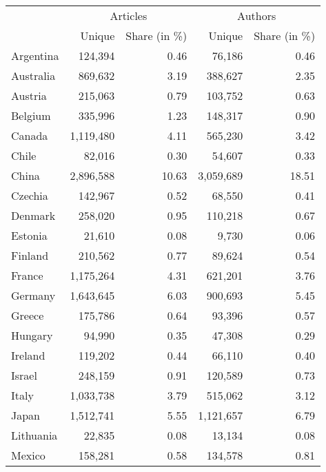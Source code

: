 \begin{tabular}{lrrrr}
\toprule
{} & \multicolumn{2}{c}{Articles} & \multicolumn{2}{c}{Authors} \\
{} &    Unique & Share (in \%) &    Unique & Share (in \%) \\
\midrule
Argentina      &   124,394 &         0.46 &    76,186 &         0.46 \\
Australia      &   869,632 &         3.19 &   388,627 &         2.35 \\
Austria        &   215,063 &         0.79 &   103,752 &         0.63 \\
Belgium        &   335,996 &         1.23 &   148,317 &         0.90 \\
Canada         & 1,119,480 &         4.11 &   565,230 &         3.42 \\
Chile          &    82,016 &         0.30 &    54,607 &         0.33 \\
China          & 2,896,588 &        10.63 & 3,059,689 &        18.51 \\
Czechia        &   142,967 &         0.52 &    68,550 &         0.41 \\
Denmark        &   258,020 &         0.95 &   110,218 &         0.67 \\
Estonia        &    21,610 &         0.08 &     9,730 &         0.06 \\
Finland        &   210,562 &         0.77 &    89,624 &         0.54 \\
France         & 1,175,264 &         4.31 &   621,201 &         3.76 \\
Germany        & 1,643,645 &         6.03 &   900,693 &         5.45 \\
Greece         &   175,786 &         0.64 &    93,396 &         0.57 \\
Hungary        &    94,990 &         0.35 &    47,308 &         0.29 \\
Ireland        &   119,202 &         0.44 &    66,110 &         0.40 \\
Israel         &   248,159 &         0.91 &   120,589 &         0.73 \\
Italy          & 1,033,738 &         3.79 &   515,062 &         3.12 \\
Japan          & 1,512,741 &         5.55 & 1,121,657 &         6.79 \\
Lithuania      &    22,835 &         0.08 &    13,134 &         0.08 \\
Mexico         &   158,281 &         0.58 &   134,578 &         0.81 \\

\end{tabular}

